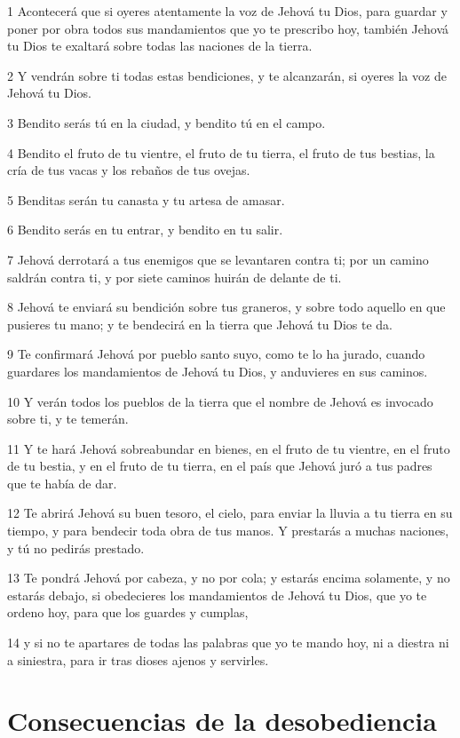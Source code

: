 \par 1 Acontecerá que si oyeres atentamente la voz de Jehová tu Dios, para guardar y poner por obra todos sus mandamientos que yo te prescribo hoy, también Jehová tu Dios te exaltará sobre todas las naciones de la tierra.
\par 2 Y vendrán sobre ti todas estas bendiciones, y te alcanzarán, si oyeres la voz de Jehová tu Dios.
\par 3 Bendito serás tú en la ciudad, y bendito tú en el campo.
\par 4 Bendito el fruto de tu vientre, el fruto de tu tierra, el fruto de tus bestias, la cría de tus vacas y los rebaños de tus ovejas.
\par 5 Benditas serán tu canasta y tu artesa de amasar.
\par 6 Bendito serás en tu entrar, y bendito en tu salir.
\par 7 Jehová derrotará a tus enemigos que se levantaren contra ti; por un camino saldrán contra ti, y por siete caminos huirán de delante de ti.
\par 8 Jehová te enviará su bendición sobre tus graneros, y sobre todo aquello en que pusieres tu mano; y te bendecirá en la tierra que Jehová tu Dios te da.
\par 9 Te confirmará Jehová por pueblo santo suyo, como te lo ha jurado, cuando guardares los mandamientos de Jehová tu Dios, y anduvieres en sus caminos.
\par 10 Y verán todos los pueblos de la tierra que el nombre de Jehová es invocado sobre ti, y te temerán.
\par 11 Y te hará Jehová sobreabundar en bienes, en el fruto de tu vientre, en el fruto de tu bestia, y en el fruto de tu tierra, en el país que Jehová juró a tus padres que te había de dar.
\par 12 Te abrirá Jehová su buen tesoro, el cielo, para enviar la lluvia a tu tierra en su tiempo, y para bendecir toda obra de tus manos. Y prestarás a muchas naciones, y tú no pedirás prestado.
\par 13 Te pondrá Jehová por cabeza, y no por cola; y estarás encima solamente, y no estarás debajo, si obedecieres los mandamientos de Jehová tu Dios, que yo te ordeno hoy, para que los guardes y cumplas,
\par 14 y si no te apartares de todas las palabras que yo te mando hoy, ni a diestra ni a siniestra, para ir tras dioses ajenos y servirles. 

\section{Consecuencias de la desobediencia}

